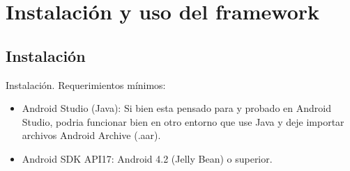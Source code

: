 \section{Instalación y uso del framework}
\subsection{Instalación}
Instalación. 
Requerimientos mínimos:
\begin{itemize}
\item Android Studio (Java): Si bien esta pensado para y probado en Android Studio, podria funcionar bien en otro entorno que use Java y deje importar archivos Android Archive (.aar).
\item Android SDK API17: Android 4.2 (Jelly Bean) o superior.
\end{itemize}

